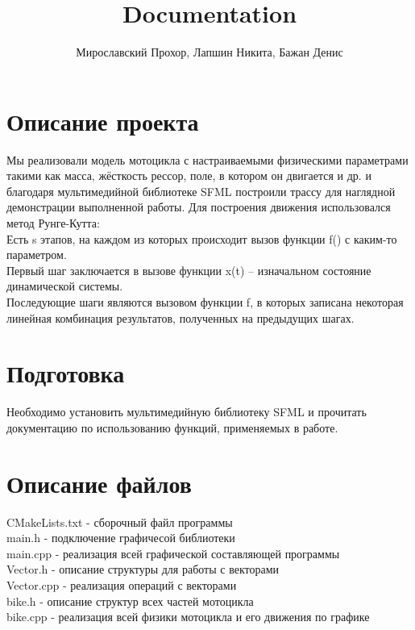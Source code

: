 \documentclass{article}
\title{Documentation}
\author{Мирославский Прохор, Лапшин Никита, Бажан Денис}
\date{}
\begin{document}
\maketitle

\section{Описание проекта}
Мы реализовали модель мотоцикла с настраиваемыми физическими параметрами такими как масса, жёсткость рессор, поле, в котором он двигается и др. и благодаря мультимедийной библиотеке SFML построили трассу для наглядной демонстрации выполненной работы. Для построения движения использовался метод Рунге-Кутта:\\
Есть s этапов, на каждом из которых происходит вызов функции f() с каким-то параметром.\\
Первый шаг заключается в вызове функции x(t) – изначальном состояние динамической системы.\\
Последующие шаги являются вызовом функции f, в которых записана некоторая линейная комбинация результатов, полученных на предыдущих шагах.\\
\section{Подготовка}
Необходимо установить мультимедийную библиотеку SFML и прочитать документацию по использованию функций, применяемых в работе.
\section{Описание файлов}
CMakeLists.txt - сборочный файл программы\\
main.h - подключение графичесой библиотеки\\
main.cpp - реализация всей графической составляющей программы\\
Vector.h - описание структуры для работы с векторами\\
Vector.cpp - реализация операций с векторами\\
bike.h - описание структур всех частей мотоцикла\\
bike.cpp - реализация всей физики мотоцикла и его движения по графике\\
\\ \\ \\ \\ \\
\end{document}

